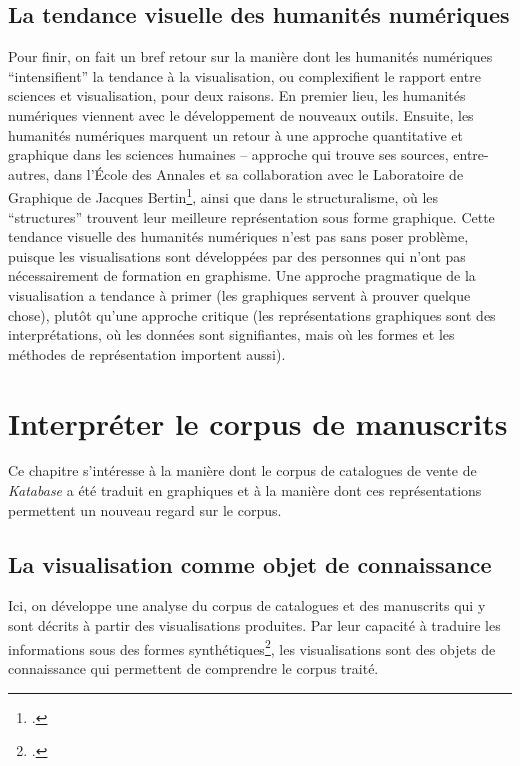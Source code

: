 \documentclass[a4paper, 12pt, twoside]{book}
\newcommand{\ktb}{\textit{Katabase}}
\begin{document}
\subsection{La tendance visuelle des humanités numériques}
Pour finir, on fait un bref retour sur la manière dont les humanités numériques \enquote{intensifient} la tendance à la visualisation, ou complexifient le rapport entre sciences et visualisation, pour deux raisons. En premier lieu, les humanités numériques viennent avec le développement de nouveaux outils. Ensuite, les humanités numériques marquent un retour à une approche quantitative et graphique dans les sciences humaines -- approche qui trouve ses sources, entre-autres, dans l'École des Annales et sa collaboration avec le Laboratoire de Graphique de Jacques Bertin\footcite{orain_laboratoire_2021}, ainsi que dans le structuralisme, où les \enquote{structures} trouvent leur meilleure représentation sous forme graphique. Cette tendance visuelle des humanités numériques n'est pas sans poser problème, puisque les visualisations sont développées par des personnes qui n'ont pas nécessairement de formation en graphisme. Une approche pragmatique de la visualisation a tendance à primer (les graphiques servent à prouver quelque chose), plutôt qu'une approche critique (les représentations graphiques sont des interprétations, où les données sont signifiantes, mais où les formes et les méthodes de représentation importent aussi).


\section{Interpréter le corpus de manuscrits}
Ce chapitre s'intéresse à la manière dont le corpus de catalogues de vente de \ktb{} a été traduit en graphiques et à la manière dont ces représentations permettent un nouveau regard sur le corpus.

\subsection{La visualisation comme objet de connaissance}
Ici, on développe une analyse du corpus de catalogues et des manuscrits qui y sont décrits à partir des visualisations produites. Par leur capacité à traduire les informations sous des formes synthétiques\footcite[p. 36]{hentschel_visual_2014}, les visualisations sont des objets de connaissance qui permettent de comprendre le corpus traité.
\end{document}
